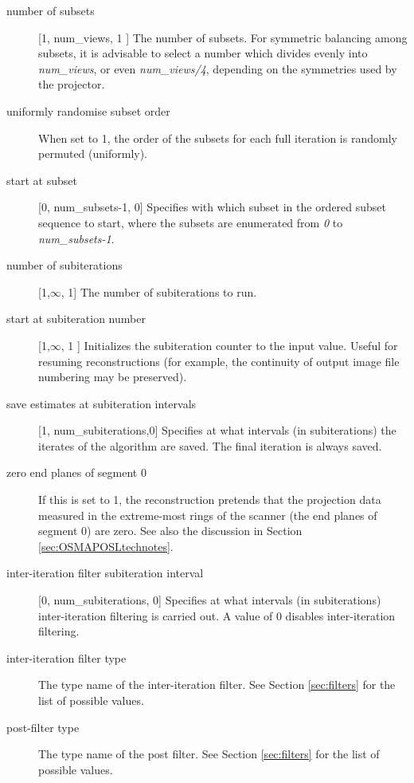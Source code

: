 \documentclass{article}
\begin{document}
\begin{description}
\item[number of subsets] [1, num\_views, 1 {]}
The number of subsets. For symmetric balancing among subsets, 
it is advisable to select a number which divides evenly into \textit{num\_views},
or even \textit{num\_views/4}, depending on the symmetries used by the projector.


\item[uniformly randomise subset order]
When set to 1, the order of the subsets for each full iteration 
is randomly permuted (uniformly).


\item[start at subset] [0, num\_subsets-1, 0{]}
Specifies with which subset in the ordered subset sequence to 
start, where the subsets are enumerated from \textit{0} to \textit{num\_subsets-1}. 

\item[number of subiterations] [1,\ensuremath{\infty}, 1{]}
The number of subiterations to run.


\item[start at subiteration number] [1,\ensuremath{\infty}, 1 {]}
Initializes the subiteration counter to the input value. Useful 
for resuming reconstructions (for example, the continuity of 
output image file numbering may be preserved).


\item[save estimates at subiteration intervals] [1, num\_subiterations,0{]} 
Specifies at what intervals (in subiterations) the iterates of 
the algorithm are saved. The final iteration is always saved.


\item[zero end planes of segment 0]
If this is set to 1, the reconstruction pretends that the projection 
data measured in the extreme-most rings of the scanner (the end 
planes of segment 0) are zero. See also the discussion in Section 
\ref{sec:OSMAPOSLtechnotes}.


\item[inter-iteration filter subiteration interval] [0, num\_subiterations, 0{]}
Specifies at what intervals (in subiterations) inter-iteration 
filtering is carried out. A value of 0 disables inter-iteration 
filtering.


\item[inter-iteration filter type]
The type name of the inter-iteration filter. See Section \ref{sec:filters}
for the list of possible values.


\item[post-filter type]
The type name of the post filter. See Section \ref{sec:filters} for the list 
of possible values.


\end{description}
\end{document}
